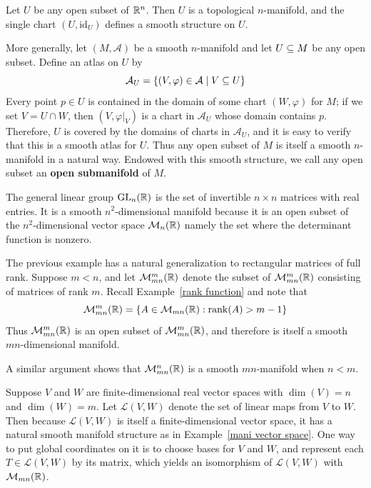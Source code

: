 \begin{example}\label{open submani}
Let $U$ be any open subset of $\mathbb{R}^n$. Then $U$ is a topological $n$-manifold, and the single chart $(U,\mathrm{id}_U)$ defines a smooth structure on $U$.\par
More generally, let $(M,\mathcal{A})$ be a smooth $n$-manifold and let $U\subseteq M$ be any open subset. Define an atlas on $U$ by
\[\mathcal{A}_U=\{(V,\varphi)\in\mathcal{A}\mid V\subseteq U\}\]
Every point $p\in U$ is contained in the domain of some chart $(W,\varphi)$ for $M$; if we set $V=U\cap W$, then $(V,\varphi|_V)$ is a chart in $\mathcal{A}_U$ whose domain contains $p$. Therefore, $U$ is covered by the domains of charts in $\mathcal{A}_U$, and it is easy to verify that this is a smooth atlas for $U$. Thus any open subset of $M$ is itself a smooth $n$-manifold in a natural way. Endowed with this smooth structure, we call any open subset an \textbf{open submanifold} of $M$.
\end{example}
\begin{example}
The general linear group $\mathrm{GL}_n(\mathbb{R})$ is the set of invertible $n\times n$ matrices with real entries. It is a smooth $n^2$-dimensional manifold because it is an open subset of the $n^2$-dimensional vector space $\mathcal{M}_n(\mathbb{R})$ namely the set where the determinant function is nonzero.
\end{example}
\begin{example}\label{full rank mani}
The previous example has a natural generalization to rectangular matrices of full rank. Suppose $m<n$, and let $\mathcal{M}_{mn}^m(\mathbb{R})$ denote the subset of $\mathcal{M}_{mn}^m(\mathbb{R})$ consisting of matrices of rank $m$. Recall Example~\ref{rank function} and note that
\[\mathcal{M}_{mn}^m(\mathbb{R})=\{A\in\mathcal{M}_{mn}(\mathbb{R}):\mathrm{rank}(A)>m-1\}\]
Thus $\mathcal{M}_{mn}^m(\mathbb{R})$ is an open subset of $\mathcal{M}_{mn}^m(\mathbb{R})$, and therefore is itself a smooth $mn$-dimensional manifold.\par
A similar argument shows that $\mathcal{M}_{mn}^n(\mathbb{R})$ is a smooth $mn$-manifold when $n<m$.
\end{example}
\begin{example}
Suppose $V$ and $W$ are finite-dimensional real vector spaces with $\dim(V)=n$ and $\dim(W)=m$. Let $\mathcal{L}(V,W)$ denote the set of linear maps from $V$ to $W$. Then
because $\mathcal{L}(V,W)$ is itself a finite-dimensional vector space, it has a natural smooth manifold structure as in Example~\ref{mani vector space}. One way to put global coordinates on it is to choose bases for $V$
and $W$, and represent each $T\in\mathcal{L}(V,W)$ by its matrix, which yields an isomorphism of $\mathcal{L}(V,W)$ with $\mathcal{M}_{mn}(\mathbb{R})$.
\end{example}
